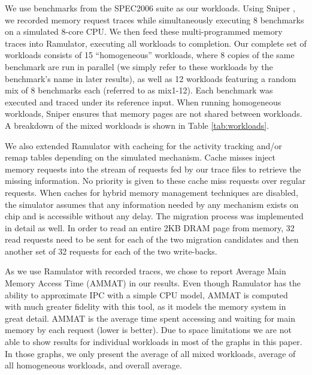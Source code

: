 We use benchmarks from the SPEC2006 suite \cite{spec} as our workloads. Using Sniper \cite{sniper}, we recorded memory request traces while simultaneously executing 8 benchmarks on a simulated 8-core CPU. We then feed these multi-programmed memory traces into Ramulator, executing all workloads to completion. Our complete set of workloads consists of 15 ``homogeneous'' workloads, where 8 copies of the same benchmark are run in parallel (we simply refer to these workloads by the benchmark's name in later results), as well as 12 workloads featuring a random mix of 8 benchmarks each (referred to as mix1-12). Each benchmark was executed and traced under its reference input. When running homogeneous workloads, Sniper ensures that memory pages are not shared between workloads. A breakdown of the mixed workloads is shown in Table \ref{tab:workloads}.



We also extended Ramulator with cacheing for the activity tracking and/or remap tables depending on the simulated mechanism. Cache misses inject memory requests into the stream of requests fed by our trace files to retrieve the missing information. No priority is given to these cache miss requests over regular requests. When caches for hybrid memory management techniques are disabled, the simulator assumes that any information needed by any mechanism exists on chip and is accessible without any delay. The migration process was implemented in detail as well. In order to read an entire 2KB DRAM page from memory, 32 read requests need to be sent for each of the two migration candidates and then another set of 32 requests for each of the two write-backs.

As we use Ramulator with recorded traces, we chose to report Average Main Memory Access Time (AMMAT) in our results. Even though Ramulator has the ability to approximate IPC with a simple CPU model, 
AMMAT is computed with much greater fidelity with this tool,
as it models the memory system in great detail. AMMAT is the average time 
spent accessing and waiting for main memory by each request (lower is better). Due to space limitations we are not able to show results for individual workloads in most of the graphs in this paper. In those graphs, we only present the average of all mixed workloads, average of all homogeneous workloads, and overall average.

